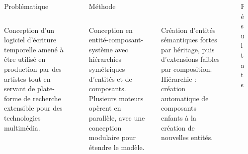 \begin{columns}[t]
   \begin{column}{\sepwid}\end{column}
     \begin{column}{\onecolwid}
      \begin{block}{Problématique}
          \begin{columns}[t]
              \begin{column}{\onecolwid}\justify
                  Conception d'un logiciel d'écriture temporelle amené à être utilisé en production par des artistes tout en servant de plate-forme de recherche extensible pour des technologies multimédia.
                \end{column}
            \end{columns}        
      \end{block}
     \end{column}
     \begin{column}{\sepwid}\end{column}
     \begin{column}{\twocolwid}
         \begin{block}{Méthode}             
             \begin{columns}[t]	                 
                 \begin{column}{\onecolwid}\justify
                     Conception en entité-composant-système avec hiérarchies symétriques d'entités et de composants. 
                     Plusieurs moteurs opèrent en parallèle, avec une conception modulaire pour étendre le modèle.
                     \end{column}
                     \begin{column}{\onecolwid}\justify
                         Création d'entités sémantiques fortes par héritage, puis d'extensions faibles par composition.
                         Hiérarchie : création automatique de composants enfants à la création de nouvelles entités. 
                        \end{column}
                \end{columns}                 
            \end{block}
      \end{column}
      \begin{column}{\sepwid}\end{column}
      \begin{column}{\onecolwid}
          \begin{block}{Résultats}

\end{block}
\end{column}
\end{columns}
